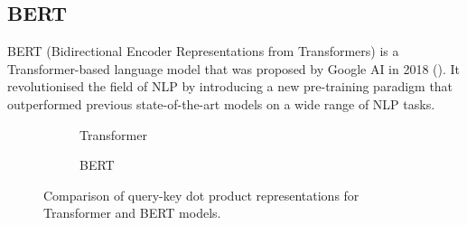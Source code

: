 \subsection{BERT}\label{subsec:bert}
BERT (Bidirectional Encoder Representations from Transformers) is a Transformer-based language model that was proposed by Google AI in 2018 (\cite{devlin-etal-2019-bert}).
It revolutionised the field of NLP by introducing a new pre-training paradigm that outperformed previous state-of-the-art models on a wide range of NLP tasks.

\begin{figure}[h]
    \centering
    \begin{subfigure}{0.45\textwidth}
        \centering
        \caption{Transformer}
        \label{fig:causal_grid}
    \end{subfigure}
    \hfill
    \begin{subfigure}{0.45\textwidth}
        \centering
        \caption{BERT}
        \label{fig:bert_grid}
    \end{subfigure}
    \caption{Comparison of query-key dot product representations for Transformer and BERT models.}
    \label{fig:grid_comparison}
\end{figure}



